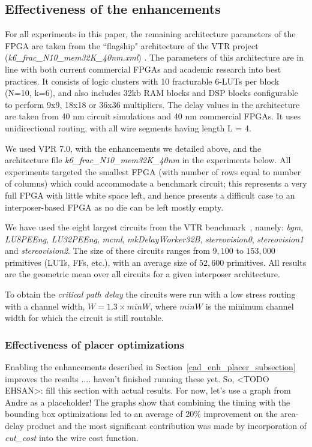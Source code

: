 \documentclass{sig-alternate-2013}
\begin{document}
\subsection{Effectiveness of the enhancements}
\label{sec:CADeffect}
For all experiments in this paper, the remaining architecture parameters of the FPGA are taken from the ``flagship" architecture of the VTR project (\textit{k6\_frac\_N10\_mem32K\_40nm.xml}) \cite{luu2014vtr}. The parameters of this architecture are in line with both current commercial FPGAs and academic research into best practices. It consists of logic clusters with 10 fracturable 6-LUTs per block (N=10, k=6), and also includes 32kb RAM blocks and DSP blocks configurable to perform 9x9, 18x18 or 36x36 multipliers. The delay values in the architecture are taken from 40 nm circuit simulations and 40 nm commercial FPGAs. It uses unidirectional routing, with all wire segments having length L = 4.

We used VPR 7.0, with the enhancements we detailed above, and the architecture file \textit{k6\_frac\_N10\_mem32K\_40nm} in the experiments below. All experiments targeted the smallest FPGA (with number of rows equal to number of columns) which could accommodate a benchmark circuit; this represents a very full FPGA with little white space left, and hence presents a difficult case to an interposer-based FPGA as no die can be left mostly empty. 

We have used the eight largest circuits from the VTR benchmark~\cite{vtr2012}, namely: \textit{bgm}, \textit{LU8PEEng}, \textit{LU32PEEng}, \textit{mcml}, \textit{mkDelayWorker32B}, \textit{stereovision0}, \textit{stereovision1} and \textit{stereovision2}. The size of these circuits ranges from $9,100$ to $153,000$ primitives (LUTs, FFs, etc.), with an average size of $52,600$ primitives. All results are the geometric mean over all circuits for a given interposer architecture.

To obtain the \textit{critical path delay} the circuits were run with a low stress routing with a channel width, $W = 1.3 \times minW$, where $minW$ is the minimum channel width for which the circuit is still routable. 

\subsubsection{Effectiveness of placer optimizations}
\label{sec:effectiveness_of_placer_enhancements}
Enabling the enhancements described in Section~\ref{cad_enh_placer_subsection} improves the results .... haven't finished running these yet. So, <TODO EHSAN>: fill this section with actual results. For now, let's use a graph from Andre as a placeholder!
The graphs show that combining the timing with the bounding box optimizations led to an average of 20\% improvement on the area-delay product and the most significant contribution was made by incorporation of \textit{cut\_cost} into the wire cost function.
\end{document}
